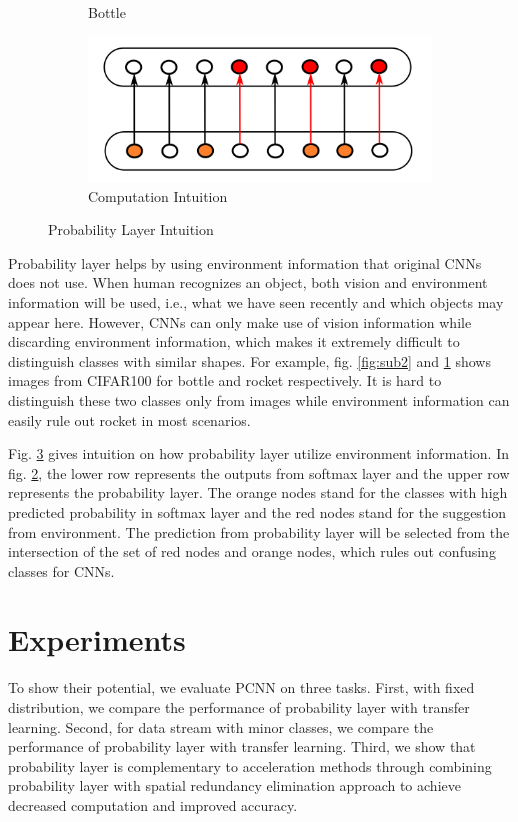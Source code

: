 \documentclass{article}
\begin{document}
\begin{figure}
\begin{subfigure}{.25\textwidth}
  \caption{Bottle}
  \label{fig:sub3}
\end{subfigure}
\begin{subfigure}{.45\textwidth}
  \centering
  \includegraphics[width=\textwidth]{intuition.png}
  \caption{Computation Intuition}
  \label{fig:sub1}
\end{subfigure}

\caption{Probability Layer Intuition}
\label{fig:intuition}
\end{figure}


Probability layer helps by using environment information that original CNNs does not use. When human recognizes an object, both vision and environment information will be used, i.e., what we have seen recently and which objects may appear here. However, CNNs can only make use of vision information while discarding environment information, which makes it extremely difficult to distinguish classes with similar shapes. For example, fig. \ref{fig:sub2} and \ref{fig:sub3} shows images from CIFAR100 for bottle and rocket respectively. It is hard to distinguish these two classes only from images while environment information can easily rule out rocket in most scenarios. 

Fig. \ref{fig:intuition} gives intuition on how probability layer utilize environment information. In fig. \ref{fig:sub1}, the lower row represents the outputs from softmax layer and the upper row represents the probability layer. The orange nodes stand for the classes with high predicted probability in softmax layer and the red nodes stand for the suggestion from environment. The prediction from probability layer will be selected from the intersection of the set of red nodes and orange nodes, which rules out confusing classes for CNNs. 



\section{Experiments}
To show their potential, we evaluate PCNN on three tasks. First, with fixed distribution, we compare the performance of probability layer with transfer learning. Second, for data stream with minor classes, we compare the performance of probability layer with transfer learning. Third, we show that probability layer is complementary to acceleration methods through combining probability layer with spatial redundancy elimination approach \cite{figurnov2016perforatedcnns} to achieve decreased computation and improved accuracy.
\end{document}

